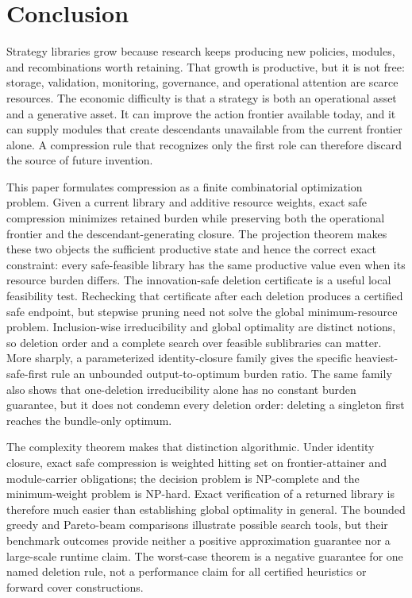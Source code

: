 \section{Conclusion}\label{sec:conclusion}

Strategy libraries grow because research keeps producing new policies,
modules, and recombinations worth retaining. That growth is productive, but
it is not free: storage, validation, monitoring, governance, and operational
attention are scarce resources. The economic difficulty is that a
strategy is both an operational asset and a generative asset. It can improve
the action frontier available today, and it can supply modules that create
descendants unavailable from the current frontier alone. A compression rule
that recognizes only the first role can therefore discard the source of
future invention.

This paper formulates compression as a finite combinatorial optimization
problem. Given a current library and additive resource weights, exact safe
compression minimizes retained burden while preserving both the operational
frontier and the descendant-generating closure. The projection theorem makes
these two objects the sufficient productive state and hence the correct exact
constraint: every safe-feasible library has the same productive value even
when its resource burden differs. The innovation-safe deletion certificate is
a useful local feasibility test. Rechecking that certificate after each
deletion produces a certified safe endpoint, but stepwise pruning need not
solve the global minimum-resource problem. Inclusion-wise irreducibility and
global optimality are distinct notions, so deletion order and a complete
search over feasible sublibraries can matter.  More sharply, a parameterized
identity-closure family gives the specific heaviest-safe-first rule an
unbounded output-to-optimum burden ratio.  The same family also shows that
one-deletion irreducibility alone has no constant burden guarantee, but it does
not condemn every deletion order: deleting a singleton first reaches the
bundle-only optimum.

The complexity theorem makes that distinction algorithmic. Under identity
closure, exact safe compression is weighted hitting set on frontier-attainer
and module-carrier obligations; the decision problem is NP-complete and the
minimum-weight problem is NP-hard. Exact verification of a returned library is
therefore much easier than establishing global optimality in general. The
bounded greedy and Pareto-beam comparisons illustrate possible search tools,
but their benchmark outcomes provide neither a positive approximation
guarantee nor a large-scale runtime claim.  The worst-case theorem is a
negative guarantee for one named deletion rule, not a performance claim for
all certified heuristics or forward cover constructions.

